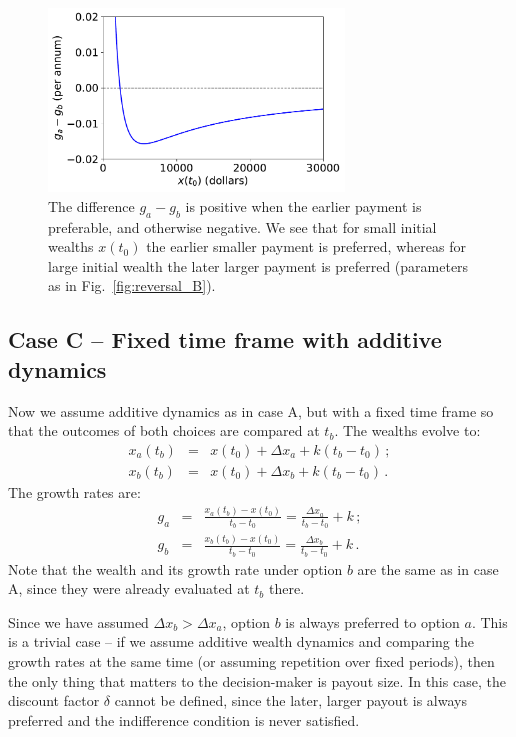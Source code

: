 \documentclass[11pt]{article}
\newcommand{\flabel}[1]{\label{fig:#1}}
\newcommand{\fref}[1]{Fig.~\ref{fig:#1}}
\newcommand{\bea}{\begin{eqnarray}}
\newcommand{\eea}{\end{eqnarray}}
\newcommand{\Dx}{\Delta x}
\numberwithin{equation}{section}
\begin{document}
\begin{figure}[!htb]
\centering
\includegraphics[width=0.7\textwidth]{./figures/ga_gb.pdf}
\caption{The difference $g_a-g_b$ is positive when the earlier payment is preferable, and otherwise negative. We see that for small initial wealths $x(t_0)$ the earlier smaller payment is preferred, whereas for large initial wealth the later larger payment is preferred (parameters as in \fref{reversal_B}).}
\flabel{reversal_B2}
\end{figure}

\FloatBarrier
\subsection{Case C -- Fixed time frame with additive dynamics}\label{sec:case_C}

Now we assume additive dynamics as in case A, but with a fixed time frame so that the outcomes of both choices are compared at $t_b$. The wealths evolve to: \bea
x_a\left(t_b\right) &=& x\left(t_0\right) + \Dx_a + k(t_b-t_0)\,; \\
x_b\left(t_b\right) &=& x\left(t_0\right) + \Dx_b + k(t_b-t_0)\,.
\eea
The growth rates are:
\bea
g_a &=& \frac{x_a\left(t_b\right) - x\left(t_0\right)}{t_b-t_0} = \frac{\Dx_a}{t_b-t_0} + k\,;\\
g_b &=& \frac{x_b\left(t_b\right) - x\left(t_0\right)}{t_b-t_0} = \frac{\Dx_b}{t_b-t_0} + k\,.
\eea
Note that the wealth and its growth rate under option $b$ are the same as in case A, since they were already evaluated at $t_b$ there.

Since we have assumed $\Dx_b > \Dx_a$, option $b$ is always preferred to option $a$. This is a trivial case -- if we assume additive wealth dynamics and comparing the growth rates at the same time (or assuming repetition over fixed periods), then the only thing that matters to the decision-maker is payout size. In this case, the discount factor $\delta$ cannot be defined, since the later, larger payout is always preferred and the indifference condition is never satisfied.
\end{document}
